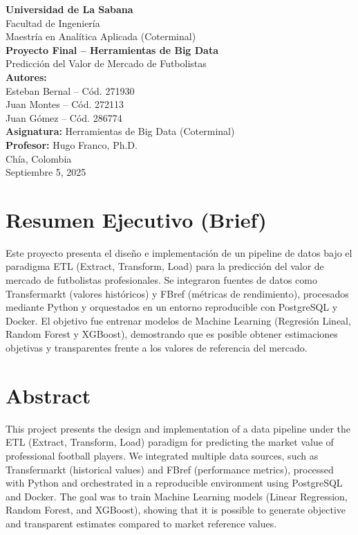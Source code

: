 \documentclass[12pt,letterpaper]{article}
\begin{document}
\begin{titlepage}
    \centering
    {\Large \textbf{Universidad de La Sabana}}\\[0.3cm]
    {\large Facultad de Ingeniería}\\[0.3cm]
    {\large Maestría en Analítica Aplicada (Coterminal)}\\[2cm]

    {\LARGE \textbf{Proyecto Final – Herramientas de Big Data}}\\[0.5cm]
    {\Large Predicción del Valor de Mercado de Futbolistas}\\[2cm]

    \textbf{Autores:}\\
Esteban Bernal -- C\'od. 271930\\
Juan Montes -- C\'od. 272113\\
Juan G\'omez -- C\'od. 286774
\\[0.5cm]

\textbf{Asignatura:} Herramientas de Big Data (Coterminal)\\
\textbf{Profesor:} Hugo Franco, Ph.D. \\[2cm]

Ch\'ia, Colombia \\
Septiembre 5, 2025


    \vfill
\end{titlepage}

\tableofcontents
\newpage

\section{Resumen Ejecutivo (Brief)}
Este proyecto presenta el diseño e implementación de un pipeline de datos bajo el paradigma ETL (Extract, Transform, Load) para la predicción del valor de mercado de futbolistas profesionales. 
Se integraron fuentes de datos como Transfermarkt (valores históricos) y FBref (métricas de rendimiento), procesados mediante Python y orquestados en un entorno reproducible con PostgreSQL y Docker. 
El objetivo fue entrenar modelos de Machine Learning (Regresión Lineal, Random Forest y XGBoost), demostrando que es posible obtener estimaciones objetivas y transparentes frente a los valores de referencia del mercado.

\section{Abstract}
This project presents the design and implementation of a data pipeline under the ETL (Extract, Transform, Load) paradigm for predicting the market value of professional football players. 
We integrated multiple data sources, such as Transfermarkt (historical values) and FBref (performance metrics), processed with Python and orchestrated in a reproducible environment using PostgreSQL and Docker. 
The goal was to train Machine Learning models (Linear Regression, Random Forest, and XGBoost), showing that it is possible to generate objective and transparent estimates compared to market reference values.
\end{document}
